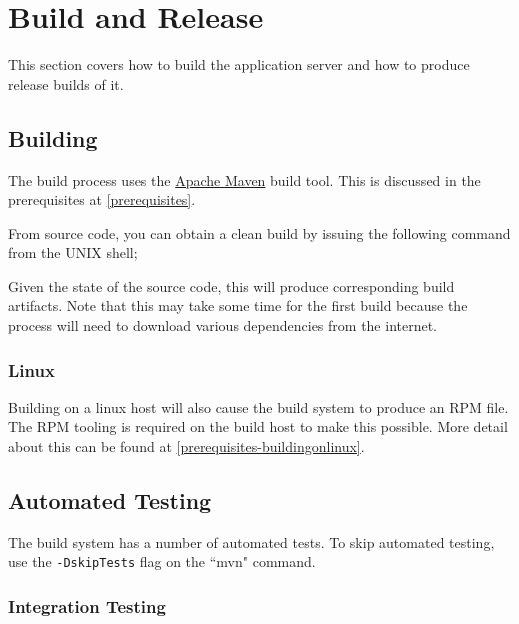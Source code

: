 
\section{Build and Release}
\label{buildandrelease}

This section covers how to build the application server and how to produce release builds of it.

\subsection{Building}

The build process uses the \href{http://maven.apache.org}{Apache Maven} build tool.  This is discussed in the prerequisites at \ref{prerequisites}.

From source code, you can obtain a clean build by issuing the following command from the UNIX shell;


Given the state of the source code, this will produce corresponding build artifacts.  Note that this may take some time for the first build because the process will need to download various dependencies from the internet.

\subsubsection{Linux}

Building on a linux host will also cause the build system to produce an RPM file.  The RPM tooling is required on the build host to make this possible.  More detail about this can be found at \ref{prerequisites-buildingonlinux}.

\subsection{Automated Testing}

The build system has a number of automated tests.  To skip automated testing, use the {\tt -DskipTests} flag on the ``mvn" command.

\subsubsection{Integration Testing}
\label{integrationtesting}

